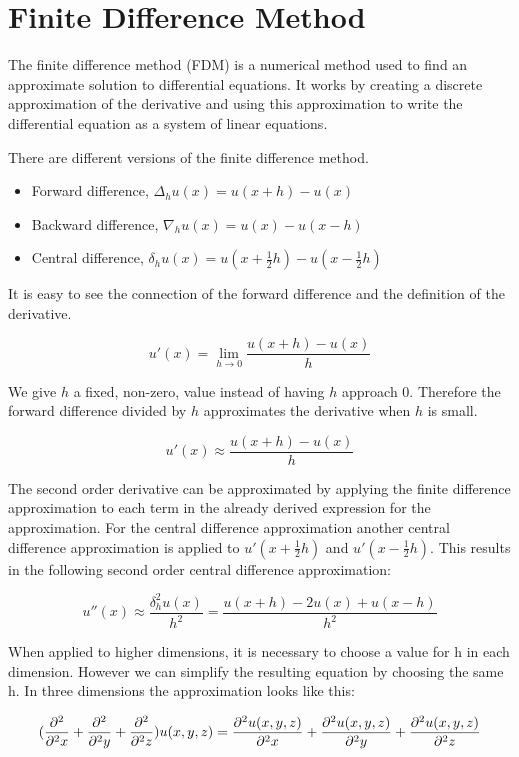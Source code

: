 \section{Finite Difference Method}

The finite difference method (FDM) is a numerical method used to find an approximate 
solution to differential equations. It works by creating a discrete approximation 
of the derivative and using this approximation to write the differential equation 
as a system of linear equations.

There are different versions of the finite difference method.
\begin{itemize}
	\item Forward difference, $\Delta_hu(x) = u(x+h) - u(x)$
	\item Backward difference, $\nabla_hu(x) = u(x) - u(x - h)$
	\item Central difference, $\delta_hu(x) = u(x + \frac{1}{2}h) - u(x - \frac{1}{2}h)$
\end{itemize}

It is easy to see the connection of the forward difference and the definition of 
the derivative.

$$u'(x) = \lim_{h \to 0} \frac{u(x+h) - u(x)}{h}$$

We give $h$ a fixed, non-zero, value instead of having $h$ approach 0. Therefore 
the forward difference divided by $h$ approximates the derivative when $h$ is small.

$$u'(x) \approx \frac{u(x+h) - u(x)}{h}$$

The second order derivative can be approximated by applying the finite difference 
approximation to each term in the already derived expression for the approximation. 
For the central difference approximation another central difference approximation 
is applied to $u'(x + \frac{1}{2}h)$ and $u'(x - \frac{1}{2}h)$. This results in 
the following second order central difference approximation:

$$u''(x) \approx \frac{\delta_h^2u(x)}{h^2} = \frac{u(x+h) - 2u(x) + u(x-h)}{h^2}$$

When applied to higher dimensions, it is necessary to choose a value for h in 
each dimension. However we can simplify the resulting equation by choosing the same h. 
In three dimensions the approximation looks like this:

$$(\frac{\partial^2}{\partial^2 x} + \frac{\partial^2}{\partial^2 y} + \frac{\partial^2}{\partial^2 z}) u(x, y, z) = \frac{\partial^2 u(x, y, z)}{\partial^2 x} 
+ \frac{\partial^2 u(x, y, z)}{\partial^2 y} + \frac{\partial^2 u(x, y, z)}{\partial^2 z}$$


